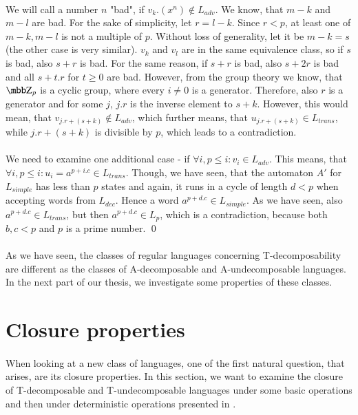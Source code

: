 \paragraph{}
We will call a number $n$ "bad", if $v_k.(x^{n}) \notin L_{adv}$. We know, that $m-k$ and $m-l$ are bad. For the sake of simplicity, let $r = l-k$. Since $r < p$, at least one of $m-k, m-l$ is not a multiple of $p$. Without loss of generality, let it be $m-k = s$ (the other case is very similar). $v_k$ and $v_l$ are in the same equivalence class, so if $s$ is bad, also $s+r$ is bad. For the same reason, if $s+r$ is bad, also $s+2r$ is bad and all $s+t.r$ for $t \geq 0$ are bad. However, from the group theory we know, that $\Z_p$ is a cyclic group, where every $i \neq 0$ is a generator. Therefore, also $r$ is a generator and for some $j$, $j.r$ is the inverse element to $s+k$. However, this would mean, that $v_{j.r+(s+k)} \notin L_{adv}$, which further means, that $u_{j.r+(s+k)} \in L_{trans}$, while $j.r+(s+k)$ is divisible by $p$, which leads to a contradiction.

\paragraph{}
We need to examine one additional case - if $\forall i, p \leq i: v_i \in L_{adv}$. This means, that $\forall i, p\leq i: u_i = a^{p+i.c} \in L_{trans}$. Though, we have seen, that the automaton $A'$ for $L_{simple}$ has less than $p$ states and again, it runs in a cycle of length $d < p$ when accepting words from $L_{dec}$. Hence a word $a^{p+d.c} \in L_{simple}$. As we have seen, also $a^{p+d.c} \in L_{trans}$, but then $a^{p+d.c} \in L_p$, which is a contradiction, because both $b,c<p$ and $p$ is a prime number. \qed

\paragraph{}
As we have seen, the classes of regular languages concerning T-decomposability are different as the classes of A-decomposable and A-undecomposable languages. In the next part of our thesis, we investigate some properties of these classes.

\section{Closure properties}

\paragraph{}
When looking at a new class of languages, one of the first natural question, that arises, are its closure properties.  In this section, we want to examine the closure of T-decomposable and T-undecomposable languages under some basic operations and then under deterministic operations presented in \cite{AFDL}.

